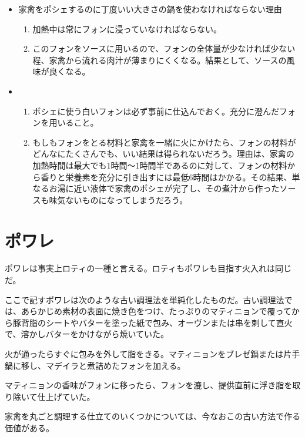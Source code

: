 \begin{itemize}
\item
  家禽をポシェするのに丁度いい大きさの鍋を使わなければならない理由

  \begin{enumerate}
  \def\labelenumi{\arabic{enumi}.}
  \item
    加熱中は常にフォンに浸っていなければならない。
  \item
    このフォンをソースに用いるので、フォンの全体量が少なければ少ない程、家禽から流れる肉汁が薄まりにくくなる。結果として、ソースの風味が良くなる。
  \end{enumerate}
\item
  　　

  \begin{enumerate}
  \def\labelenumi{\arabic{enumi}.}
  \item
    ポシェに使う白いフォンは必ず事前に仕込んでおく。充分に澄んだフォンを用いること。
  \item
    もしもフォンをとる材料と家禽を一緒に火にかけたら、フォンの材料がどんなにたくさんでも、いい結果は得られないだろう。理由は、家禽の加熱時間は最大でも1時間〜1時間半であるのに対して、フォンの材料から香りと栄養素を充分に引き出すには最低6時間はかかる。その結果、単なるお湯に近い液体で家禽のポシェが完了し、その煮汁から作ったソースも味気ないものになってしまうだろう。
  \end{enumerate}
\end{itemize}

\hypertarget{ux30ddux30efux30ec}{%
\section{ポワレ}\label{ux30ddux30efux30ec}}

ポワレは事実上ロティの一種と言える。ロティもポワレも目指す火入れは同じだ。

ここで記すポワレは次のような古い調理法を単純化したものだ。古い調理法では、あらかじめ素材の表面に焼き色をつけ、たっぷりのマティニョンで覆ってから豚背脂のシートやバターを塗った紙で包み、オーヴンまたは串を刺して直火で、溶かしバターをかけながら焼いていた。

火が通ったらすぐに包みを外して脂をきる。マティニョンをブレゼ鍋または片手鍋に移し、マデイラと煮詰めたフォンを加える。

マティニョンの香味がフォンに移ったら、フォンを漉し、提供直前に浮き脂を取り除いて仕上げていた。

家禽を丸ごと調理する仕立てのいくつかについては、今なおこの古い方法で作る価値がある。

